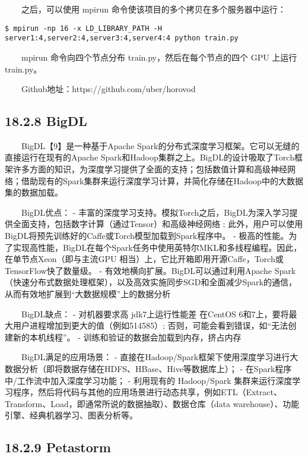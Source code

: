   之后，可以使用 mpirun 命令使该项目的多个拷贝在多个服务器中运行：

\begin{verbatim}
$ mpirun -np 16 -x LD_LIBRARY_PATH -H 
server1:4,server2:4,server3:4,server4:4 python train.py
\end{verbatim}

  mpirun 命令向四个节点分布 train.py，然后在每个节点的四个 GPU 上运行
train.py。

  Github地址：https://github.com/uber/horovod

\subsection{18.2.8 BigDL}\label{bigdl}

  BigDL【9】是一种基于Apache
Spark的分布式深度学习框架。它可以无缝的直接运行在现有的Apache
Spark和Hadoop集群之上。BigDL的设计吸取了Torch框架许多方面的知识，为深度学习提供了全面的支持；包括数值计算和高级神经网络；借助现有的Spark集群来运行深度学习计算，并简化存储在Hadoop中的大数据集的数据加载。

  BigDL优点： -
丰富的深度学习支持。模拟Torch之后，BigDL为深入学习提供全面支持，包括数字计算（通过Tensor）和高级神经网络
;
此外，用户可以使用BigDL将预先训练好的Caffe或Torch模型加载到Spark程序中。
-
极高的性能。为了实现高性能，BigDL在每个Spark任务中使用英特尔MKL和多线程编程。因此，在单节点Xeon（即与主流GPU
相当）上，它比开箱即用开源Caffe，Torch或TensorFlow快了数量级。 -
有效地横向扩展。BigDL可以通过利用Apache
Spark（快速分布式数据处理框架），以及高效实施同步SGD和全面减少Spark的通信，从而有效地扩展到``大数据规模''上的数据分析

  BigDL缺点： - 对机器要求高 jdk7上运行性能差 在CentOS
6和7上，要将最大用户进程增加到更大的值（例如514585）;
否则，可能会看到错误，如``无法创建新的本机线程''。 -
训练和验证的数据会加载到内存，挤占内存

  BigDL满足的应用场景： -
直接在Hadoop/Spark框架下使用深度学习进行大数据分析（即将数据存储在HDFS、HBase、Hive等数据库上）；
- 在Spark程序中/工作流中加入深度学习功能； - 利用现有的 Hadoop/Spark
集群来运行深度学习程序，然后将代码与其他的应用场景进行动态共享，例如ETL（Extract、Transform、Load，即通常所说的数据抽取）、数据仓库（data
warehouse）、功能引擎、经典机器学习、图表分析等。

\subsection{18.2.9 Petastorm}\label{petastorm}

